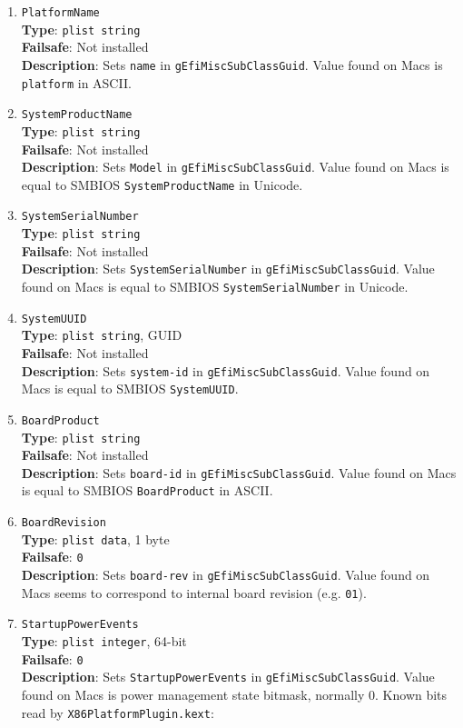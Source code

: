 \documentclass[]{article}
\begin{document}
\begin{enumerate}
\item
  \texttt{PlatformName}\\
  \textbf{Type}: \texttt{plist\ string}\\
  \textbf{Failsafe}: Not installed\\
  \textbf{Description}: Sets \texttt{name} in
  \texttt{gEfiMiscSubClassGuid}. Value found on Macs is
  \texttt{platform} in ASCII.
\item
  \texttt{SystemProductName}\\
  \textbf{Type}: \texttt{plist\ string}\\
  \textbf{Failsafe}: Not installed\\
  \textbf{Description}: Sets \texttt{Model} in
  \texttt{gEfiMiscSubClassGuid}. Value found on Macs is equal to SMBIOS
  \texttt{SystemProductName} in Unicode.
\item
  \texttt{SystemSerialNumber}\\
  \textbf{Type}: \texttt{plist\ string}\\
  \textbf{Failsafe}: Not installed\\
  \textbf{Description}: Sets \texttt{SystemSerialNumber} in
  \texttt{gEfiMiscSubClassGuid}. Value found on Macs is equal to SMBIOS
  \texttt{SystemSerialNumber} in Unicode.
\item
  \texttt{SystemUUID}\\
  \textbf{Type}: \texttt{plist\ string}, GUID\\
  \textbf{Failsafe}: Not installed\\
  \textbf{Description}: Sets \texttt{system-id} in
  \texttt{gEfiMiscSubClassGuid}. Value found on Macs is equal to SMBIOS
  \texttt{SystemUUID}.
\item
  \texttt{BoardProduct}\\
  \textbf{Type}: \texttt{plist\ string}\\
  \textbf{Failsafe}: Not installed\\
  \textbf{Description}: Sets \texttt{board-id} in
  \texttt{gEfiMiscSubClassGuid}. Value found on Macs is equal to SMBIOS
  \texttt{BoardProduct} in ASCII.
\item
  \texttt{BoardRevision}\\
  \textbf{Type}: \texttt{plist\ data}, 1 byte\\
  \textbf{Failsafe}: \texttt{0}\\
  \textbf{Description}: Sets \texttt{board-rev} in
  \texttt{gEfiMiscSubClassGuid}. Value found on Macs seems to correspond
  to internal board revision (e.g. \texttt{01}).
\item
  \texttt{StartupPowerEvents}\\
  \textbf{Type}: \texttt{plist\ integer}, 64-bit\\
  \textbf{Failsafe}: \texttt{0}\\
  \textbf{Description}: Sets \texttt{StartupPowerEvents} in
  \texttt{gEfiMiscSubClassGuid}. Value found on Macs is power management
  state bitmask, normally 0. Known bits read by
  \texttt{X86PlatformPlugin.kext}:


\end{enumerate}
\end{document}

